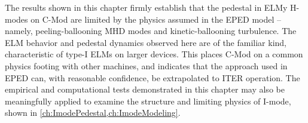 The results shown in this chapter firmly establish that the pedestal in ELMy H-modes on C-Mod are limited by the physics assumed in the EPED model -- namely, peeling-ballooning MHD modes and kinetic-ballooning turbulence.  The ELM behavior and pedestal dynamics observed here are of the familiar kind, characteristic of type-I ELMs on larger devices.  This places C-Mod on a common physics footing with other machines, and indicates that the approach used in EPED can, with reasonable confidence, be extrapolated to ITER operation.  The empirical and computational tests demonstrated in this chapter may also be meaningfully applied to examine the structure and limiting physics of I-mode, shown in \cref{ch:ImodePedestal,ch:ImodeModeling}.\nicechapterending



